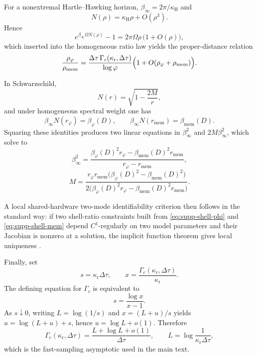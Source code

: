 \documentclass[11pt]{amsart}
\numberwithin{equation}{section}
\theoremstyle{remark}
\begin{document}
For a nonextremal Hartle--Hawking horizon, $\beta_\infty=2\pi/\kappa_{\mathrm H}$ and
\[
N(\rho)=\kappa_{\mathrm H}\rho+O(\rho^3).
\]
Hence
\[
e^{\beta_\infty\Omega N(\rho)}-1
=
2\pi\Omega\rho\,\bigl(1+O(\rho)\bigr),
\]
which inserted into the homogeneous ratio law yields the proper-distance relation
\begin{equation}\label{eq:supp-rho-ratio}
\frac{\rho_{\varphi}}{\rho_{\mathrm{mem}}}
=
\frac{\Delta\tau\,\Gamma_c(\kappa_{\mathrm r},\Delta\tau)}{\log\varphi}
\Bigl(1+O(\rho_{\varphi}+\rho_{\mathrm{mem}})\Bigr).
\end{equation}

In Schwarzschild,
\[
N(r)=\sqrt{1-\frac{2M}{r}},
\]
and under homogeneous spectral weight one has
\[
\beta_\infty N(r_{\varphi})=\beta_{\varphi}(D),
\qquad
\beta_\infty N(r_{\mathrm{mem}})=\beta_{\mathrm{mem}}(D).
\]
Squaring these identities produces two linear equations in $\beta_\infty^2$ and $2M\beta_\infty^2$, which solve to
\begin{equation}\label{eq:supp-beta-infty}
\beta_\infty^2=
\frac{\beta_{\varphi}(D)^2r_{\varphi}-\beta_{\mathrm{mem}}(D)^2r_{\mathrm{mem}}}
{r_{\varphi}-r_{\mathrm{mem}}},
\end{equation}
\begin{equation}\label{eq:supp-mass}
M=
\frac{r_{\varphi}r_{\mathrm{mem}}\bigl(\beta_{\varphi}(D)^2-\beta_{\mathrm{mem}}(D)^2\bigr)}
{2\bigl(\beta_{\varphi}(D)^2r_{\varphi}-\beta_{\mathrm{mem}}(D)^2r_{\mathrm{mem}}\bigr)}.
\end{equation}

A local shared-hardware two-mode identifiability criterion then follows in the standard way: if two shell-ratio constraints built from \eqref{eq:supp-shell-phi} and \eqref{eq:supp-shell-mem} depend $C^1$-regularly on two model parameters and their Jacobian is nonzero at a solution, the implicit function theorem gives local uniqueness \cite{KrantzParks2002}.

Finally, set
\[
s=\kappa_{\mathrm r}\Delta\tau,
\qquad
x=\frac{\Gamma_c(\kappa_{\mathrm r},\Delta\tau)}{\kappa_{\mathrm r}}.
\]
The defining equation for $\Gamma_c$ is equivalent to
\[
s=\frac{\log x}{x-1}.
\]
As $s\downarrow0$, writing $L=\log(1/s)$ and $x=(L+u)/s$ yields $u=\log(L+u)+s$, hence $u=\log L+o(1)$. Therefore
\begin{equation}\label{eq:supp-fast-gammac}
\Gamma_c(\kappa_{\mathrm r},\Delta\tau)
=
\frac{L+\log L+o(1)}{\Delta\tau},
\qquad
L=\log\frac{1}{\kappa_{\mathrm r}\Delta\tau},
\end{equation}
which is the fast-sampling asymptotic used in the main text.


\end{document}
